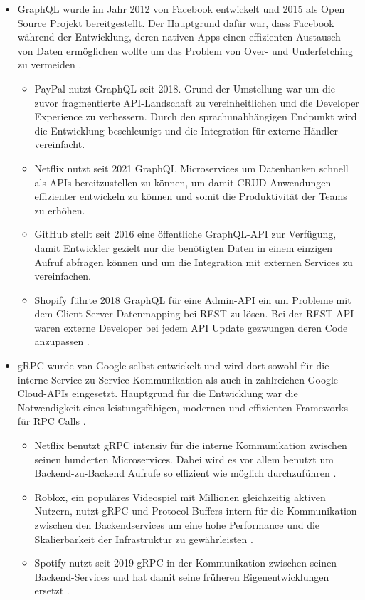 \begin{itemize}
	\item GraphQL wurde im Jahr 2012 von Facebook entwickelt und 2015 als Open Source Projekt bereitgestellt. Der Hauptgrund dafür war, dass Facebook während der Entwicklung, deren nativen Apps einen effizienten Austausch von Daten ermöglichen wollte um das Problem von Over- und Underfetching zu vermeiden \parencite{graphql-org, amazon2025graphql}.
		\begin{itemize}
			\item PayPal nutzt GraphQL seit 2018. Grund der Umstellung war um die zuvor fragmentierte API-Landschaft zu vereinheitlichen und die Developer Experience zu verbessern. Durch den sprachunabhängigen Endpunkt wird die Entwicklung beschleunigt und die Integration für externe Händler vereinfacht. 
			\item Netflix nutzt seit 2021 GraphQL Microservices um Datenbanken schnell als APIs bereitzustellen zu können, um damit CRUD Anwendungen effizienter entwickeln zu können und somit die Produktivität der Teams zu erhöhen.
			\item GitHub stellt seit 2016 eine öffentliche GraphQL-API zur Verfügung, damit Entwickler gezielt nur die benötigten Daten in einem einzigen Aufruf abfragen können und um die Integration mit externen Services zu vereinfachen.
			\item Shopify führte 2018 GraphQL für eine Admin-API ein um Probleme mit dem Client-Server-Datenmapping bei REST zu lösen. Bei der REST API waren externe Developer bei jedem API Update gezwungen deren Code anzupassen \parencite{nordicapis-graphql-examples}.
		\end{itemize}
	\item gRPC wurde von Google selbst entwickelt und wird dort sowohl für die interne Service-zu-Service-Kommunikation als auch in zahlreichen Google-Cloud-APIs eingesetzt. Hauptgrund für die Entwicklung war die Notwendigkeit eines leistungsfähigen, modernen und effizienten Frameworks für RPC Calls \parencite{gRPCAbout}.
		\begin{itemize}
			\item Netflix benutzt gRPC intensiv für die interne Kommunikation zwischen seinen hunderten Microservices. Dabei wird es vor allem benutzt um Backend-zu-Backend Aufrufe so effizient wie möglich durchzuführen \parencite{netflix-protobuf}.
			\item Roblox, ein populäres Videospiel mit Millionen gleichzeitig aktiven Nutzern, nutzt gRPC und Protocol Buffers intern für die Kommunikation zwischen den Backendservices um eine hohe Performance und die Skalierbarkeit der Infrastruktur zu gewährleisten \parencite{roblox-analytics}.
			\item Spotify nutzt seit 2019 gRPC in der Kommunikation zwischen seinen Backend-Services und hat damit seine früheren Eigenentwicklungen ersetzt \parencite{spotify-k8s-case}.
		\end{itemize}
\end{itemize}

